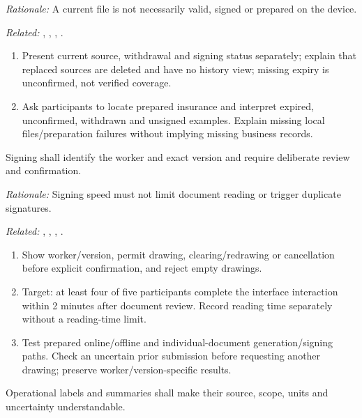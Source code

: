 \textit{Rationale:} A current file is not necessarily valid, signed or prepared on the device.

\textit{Related:} \hyperref[fr:038]{}, \hyperref[fr:039]{}, \hyperref[fr:041]{}, \hyperref[fr:044]{}.
\begin{enumerate}[label=(\alph*),leftmargin=*,itemsep=1pt,topsep=3pt]
\item Present current source, withdrawal and signing status separately; explain that replaced sources are deleted and have no history view; missing expiry is unconfirmed, not verified coverage.
\item Ask participants to locate prepared insurance and interpret expired, unconfirmed, withdrawn and unsigned examples. Explain missing local files/preparation failures without implying missing business records.
\end{enumerate}

\label{nfr:USA-05}
Signing shall identify the worker and exact version and require deliberate review and confirmation.

\textit{Rationale:} Signing speed must not limit document reading or trigger duplicate signatures.

\textit{Related:} \hyperref[fr:042]{}, \hyperref[fr:043]{}, \hyperref[fr:044]{}, \hyperref[fr:045]{}.
\begin{enumerate}[label=(\alph*),leftmargin=*,itemsep=1pt,topsep=3pt]
\item Show worker/version, permit drawing, clearing/redrawing or cancellation before explicit confirmation, and reject empty drawings.
\item Target: at least four of five participants complete the interface interaction within 2 minutes after document review. Record reading time separately without a reading-time limit.
\item Test prepared online/offline and individual-document generation/signing paths. Check an uncertain prior submission before requesting another drawing; preserve worker/version-specific results.
\end{enumerate}

\label{nfr:USA-06}
Operational labels and summaries shall make their source, scope, units and uncertainty understandable.

